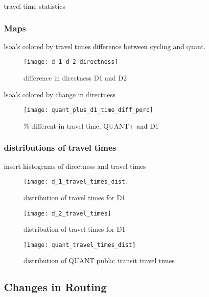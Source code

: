 \begin{table}
\centering
\caption{travel time statistics}
\label{table:travel_time_stats}
\end{table}

\subsubsection{Maps}

lsoa's colored by travel times difference between cycling and quant. 

\begin{figure}
\centering
\texttt{[image: d\_1\_d\_2\_directness]}
\caption{difference in directness D1 and D2}
\label{fig:d1_d2_directness}
\end{figure}


lsoa's colored by change in directness 

\begin{figure}
\centering
\texttt{[image: quant\_plus\_d1\_time\_diff\_perc]}
\caption{\% different in travel time, QUANT+ and D1}
\label{fig:quant_d1_time}
\end{figure}

\subsubsection{distributions of travel times}

insert histograms of directness and travel times
\begin{figure}
\centering
\texttt{[image: d\_1\_travel\_times\_dist]}
\caption{distribution of travel times for D1}
\label{fig:d1_distrib}
\end{figure}


\begin{figure}
\centering
\texttt{[image: d\_2\_travel\_times]}
\caption{distribution of travel times for D1}
\label{fig:d2_distrib}
\end{figure}


\begin{figure}
\centering
\texttt{[image: quant\_travel\_times\_dist]}
\caption{distribution of QUANT public transit travel times}
\label{fig:quant_distrib}
\end{figure}


\subsection{Changes in Routing}

